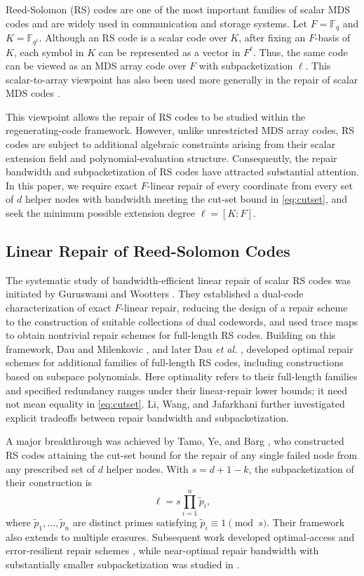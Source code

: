 \documentclass[11pt,onecolumn]{IEEEtran}
\newcommand{\F}{\mathbb{F}}
\begin{document}
Reed-Solomon (RS) codes \cite{ReedSolomon1960} are one of the most important families of scalar MDS codes and are widely used in communication and storage systems. Let $F=\F_q$ and $K=\F_{q^\ell}$. Although an RS code is a scalar code over $K$, after fixing an $F$-basis of $K$, each symbol in $K$ can be represented as a vector in $F^\ell$. Thus, the same code can be viewed as an MDS array code over $F$ with subpacketization $\ell$. This scalar-to-array viewpoint has also been used more generally in the repair of scalar MDS codes \cite{ShanmugamEtAl2014}.

This viewpoint allows the repair of RS codes to be studied within the regenerating-code framework. However, unlike unrestricted MDS array codes, RS codes are subject to additional algebraic constraints arising from their scalar extension field and polynomial-evaluation structure. Consequently, the repair bandwidth and subpacketization of RS codes have attracted substantial attention. In this paper, we require exact $F$-linear repair of every coordinate from every set of $d$ helper nodes with bandwidth meeting the cut-set bound in \eqref{eq:cutset}, and seek the minimum possible extension degree $\ell=[K:F]$.


\subsection{Linear Repair of Reed-Solomon Codes}
The systematic study of bandwidth-efficient linear repair of scalar RS
codes was initiated by Guruswami and Wootters \cite{GW2017}. They
established a dual-code characterization of exact $F$-linear repair,
reducing the design of a repair scheme to the construction of suitable
collections of dual codewords, and used trace maps to obtain
nontrivial repair schemes for full-length RS codes. Building on this
framework, Dau and Milenkovic \cite{DauMilenkovic2017}, and later Dau
\emph{et al.} \cite{DauEtAl2021}, developed optimal repair schemes for
additional families of full-length RS codes, including constructions
based on subspace polynomials. Here optimality refers to their
full-length families and specified redundancy ranges under their
linear-repair lower bounds; it need not mean equality in
\eqref{eq:cutset}. Li, Wang, and Jafarkhani
\cite{LiWangJafarkhani2019} further investigated explicit tradeoffs
between repair bandwidth and subpacketization.

A major breakthrough was achieved by Tamo, Ye, and Barg
\cite{TYB2017,TYB2019}, who constructed RS codes attaining the cut-set
bound for the repair of any single failed node from any prescribed set
of $d$ helper nodes. With $s=d+1-k$, the subpacketization of their construction is
\[
\ell=s\prod_{i=1}^{n}\tilde p_i,
\]
where $\tilde p_1,\ldots,\tilde p_n$ are distinct primes satisfying
$\tilde p_i\equiv1\pmod s$. Their framework also extends to multiple
erasures. Subsequent work developed optimal-access and
error-resilient repair schemes \cite{ChenYeBarg2020}, while
near-optimal repair bandwidth with substantially smaller
subpacketization was studied in \cite{GuruswamiJiang2019}.
\end{document}
